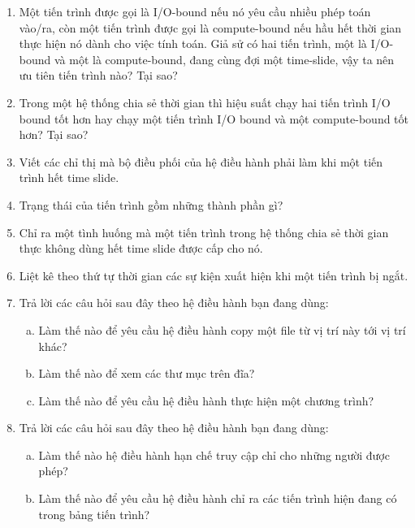 \begin{multicols}{2}
\begin{enumerate}
  \item Một tiến trình được gọi là I/O-bound nếu nó yêu cầu nhiều phép
    toán vào/ra, còn một tiến trình được gọi là compute-bound nếu hầu
    hết thời gian thực hiện nó dành cho việc tính toán. Giả sử có hai
    tiến trình, một là I/O-bound và một là compute-bound, đang cùng
    đợi một time-slide, vậy ta nên ưu tiên tiến trình nào? Tại sao?

  \item Trong một hệ thống chia sẻ thời gian thì hiệu suất chạy hai
    tiến trình I/O bound tốt hơn hay chạy một tiến trình I/O bound và
    một compute-bound tốt hơn? Tại sao?

  \item Viết các chỉ thị mà bộ điều phối của hệ điều hành phải làm khi
    một tiến trình hết time slide.

  \item Trạng thái của tiến trình gồm những thành phần gì?

  \item Chỉ ra một tình huống mà một tiến trình trong hệ thống chia sẻ
    thời gian thực không dùng hết time slide được cấp cho nó.

  \item Liệt kê theo thứ tự thời gian các sự kiện xuất hiện khi một
    tiến trình bị ngắt.

  \item Trả lời các câu hỏi sau đây theo hệ điều hành bạn đang dùng:
    \begin{enumerate}[a.]
    \item Làm thế nào để yêu cầu hệ điều hành copy một file từ vị
      trí này tới vị trí khác?

    \item Làm thế nào để xem các thư mục trên đĩa?

    \item Làm thế nào để yêu cầu hệ điều hành thực hiện một chương trình?
    \end{enumerate}

  \item Trả lời các câu hỏi sau đây theo hệ điều hành bạn đang dùng:
    \begin{enumerate}[a.]
    \item Làm thế nào hệ điều hành hạn chế truy cập chỉ cho những
      người được phép?

    \item Làm thế nào để yêu cầu hệ điều hành chỉ ra các tiến trình
      hiện đang có trong bảng tiến trình?


\end{enumerate}
\end{enumerate}
\end{multicols}
